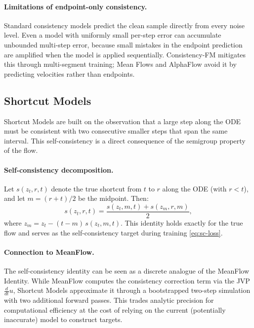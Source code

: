 \paragraph{Limitations of endpoint-only consistency.} Standard consistency models predict the clean sample directly from every noise level. Even a model with uniformly small per-step error can accumulate unbounded multi-step error, because small mistakes in the endpoint prediction are amplified when the model is applied sequentially. Consistency-FM mitigates this through multi-segment training; Mean Flows and AlphaFlow avoid it by predicting velocities rather than endpoints.


\subsection{Shortcut Models}
\label{subsec:theory-shortcut}

Shortcut Models are built on the observation that a large step along the ODE must be consistent with two consecutive smaller steps that span the same interval. This self-consistency is a direct consequence of the semigroup property of the flow.

\paragraph{Self-consistency decomposition.} Let $s(z_t, r, t)$ denote the true shortcut from $t$ to $r$ along the ODE (with $r < t$), and let $m = (r+t)/2$ be the midpoint. Then:
\begin{equation}
    s(z_t, r, t) = \frac{s(z_t, m, t) + s(z_m, r, m)}{2},
\end{equation}
where $z_m = z_t - (t-m)\,s(z_t, m, t)$. This identity holds exactly for the true flow and serves as the self-consistency target during training \cref{eq:sc-loss}.

\paragraph{Connection to MeanFlow.} The self-consistency identity can be seen as a discrete analogue of the MeanFlow Identity. While MeanFlow computes the consistency correction term via the JVP $\frac{d}{dt}u$, Shortcut Models approximate it through a bootstrapped two-step simulation with two additional forward passes. This trades analytic precision for computational efficiency at the cost of relying on the current (potentially inaccurate) model to construct targets.

